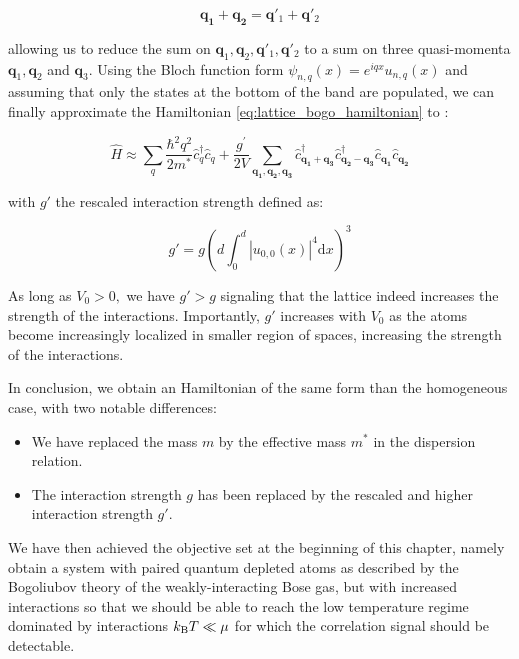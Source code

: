 \begin{equation}
    \bm{q_1} + \bm{q_2} = \bm{q}'_1 + \bm{q}'_2
\end{equation}

\noindent allowing us to reduce the sum on $\bm{q}_1,\bm{q}_2, \bm{q}'_1, \bm{q}'_2$ to a sum on three quasi-momenta $\bm{q}_1,\bm{q}_2$ and $\bm{q}_3$. Using the Bloch function form $\psi_{n,q} (x)= e^{iqx} u_{n,q} (x)$ and assuming that only the states at the bottom of the band are populated, we can finally approximate the Hamiltonian \ref{eq:lattice_bogo_hamiltonian} to \cite{dalibard2013cages}:

\begin{equation}
    \hat{H} \approx \sum_{q} \frac{\hbar^{2} q^{2}}{2 m^{*}} \hat{c}_{q}^{\dagger} \hat{c}_{q}+\frac{g^{\prime}}{2 V} \sum_{\bm{q_{1}}, \bm{q_{2}}, \bm{q_{3}}} \hat{c}^{\dagger}_{\bm{q_1}+\bm{q_3}} \hat{c}^{\dagger}_{\bm{q_2}-\bm{q_3}} \hat{c}_{\bm{q_1}} \hat{c}_{\bm{q_2}} 
\end{equation}

\noindent with $g'$ the rescaled interaction strength defined as:

\begin{equation}
    g' = g \left(d \int_0^d |u_{0,0} (x)|^4 \mathrm{d}x \right)^3
\end{equation}

\noindent As long as $V_0 > 0,$ we have $g' > g$ signaling that the lattice indeed increases the strength of the interactions. Importantly, $g'$ increases with $V_0$ as the atoms become increasingly localized in smaller region of spaces, increasing the strength of the interactions.

In conclusion, we obtain an Hamiltonian of the same form than the homogeneous case, with two notable differences:

\begin{itemize}
    \item We have replaced the mass $m$ by the effective mass $m^*$ in the dispersion relation.
    \item The interaction strength $g$ has been replaced by the rescaled and higher interaction strength $g'$.
\end{itemize}

We have then achieved the objective set at the beginning of this chapter, namely obtain a system with \kmk paired quantum depleted atoms as described by the Bogoliubov theory of the weakly-interacting Bose gas, but with increased interactions so that we should be able to reach the low temperature regime dominated by interactions $k_{\mathrm{B}} T \ll \mu$ for which the \kmk correlation signal should be detectable.